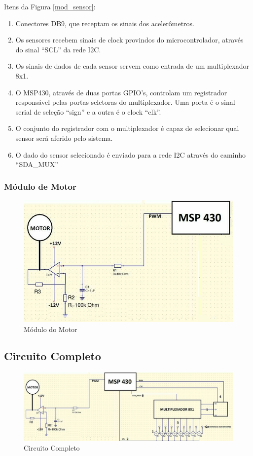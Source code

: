 Itens da Figura \ref{mod_sensor}:

\begin{enumerate}
	\item Conectores DB9, que receptam os sinais dos acelerômetros.
	\item Os sensores recebem sinais de clock provindos do microcontrolador, através do sinal “SCL” da rede I2C.
	\item Os sinais de dados de cada sensor servem como entrada de um multiplexador 8x1.
	\item O MSP430, através de duas portas GPIO's, controlam um registrador responsável pelas portas seletoras do multiplexador. Uma porta é o sinal serial de seleção “sign” e a outra é o clock “clk”.
	\item O conjunto do registrador com o multiplexador é capaz de selecionar qual sensor será aferido pelo sistema.
	\item O dado do sensor selecionado é enviado para a rede I2C através do caminho “SDA_MUX”
\end{enumerate}

\subsubsection{Módulo de Motor}

\begin{figure}[htbp]
	\centering
		\includegraphics[scale=0.6]{figuras/mod_motor.png}
	\caption{Módulo do Motor}
	\label{mod_motor}
\end{figure}


\subsection{Circuito Completo}

\begin{figure}[htbp]
	\centering
		\includegraphics[scale=0.2]{figuras/mod_completo.png}
	\caption{Circuito Completo}
	\label{mod_completo}
\end{figure}
